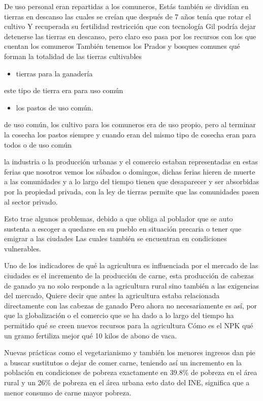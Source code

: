 \documentclass[
  letterpaper,
  DIV=11,
  numbers=noendperiod]{scrartcl}
\providecommand{\tightlist}{%
  \setlength{\itemsep}{0pt}\setlength{\parskip}{0pt}}\usepackage{longtable,booktabs,array}
\begin{document}
De uso personal eran repartidas a los comuneros, Estás también se
dividían en tierras en descanso las cuales se creían que después de 7
años tenía que rotar el cultivo Y recuperada su fertilidad restricción
que con tecnología Gil podría dejar detenerse las tierras en descanso,
pero claro eso pasa por los recursos con los que cuentan los comuneros
También tenemos los Prados y bosques comunes qué forman la totalidad de
las tierras cultivables

\begin{itemize}
\tightlist
\item
  tierras para la ganadería
\end{itemize}

este tipo de tierra era para uso común

\begin{itemize}
\tightlist
\item
  los pastos de uso común.
\end{itemize}

de uso común, los cultivo para los comuneros era de uso propio, pero al
terminar la cosecha los pastos siempre y cuando eran del mismo tipo de
cosecha eran para todos o de uso común

la industria o la producción urbanas y el comercio estaban representadas
en estas ferias que nosotros vemos los sábados o domingos, dichas ferias
hieren de muerte a las comunidades y a lo largo del tiempo tienen que
desaparecer y ser absorbidas por la propiedad privada, con la ley de
tierras permite que las comunidades pasen al sector privado.

Esto trae algunos problemas, debido a que obliga al poblador que se auto
sustenta a escoger a quedarse en su pueblo en situación precaria o tener
que emigrar a las ciudades Las cuales también se encuentran en
condiciones vulnerables.

Uno de los indicadores de qué la agricultura es influenciada por el
mercado de las ciudades es el incremento de la producción de carne, esta
producción de cabezas de ganado ya no solo responde a la agricultura
rural sino también a las exigencias del mercado, Quiere decir que antes
la agricultura estaba relacionada directamente con las cabezas de ganado
Pero ahora no necesariamente es así, por que la globalización o el
comercio que se ha dado a lo largo del tiempo ha permitido qué se creen
nuevos recursos para la agricultura Cómo es el NPK qué un gramo
fertiliza mejor qué 10 kilos de abono de vaca.

Nuevas prácticas como el vegetarianismo y también los menores ingresos
dan pie a buscar sustitutos o dejar de comer carne, teniendo así un
incremento en la población en condiciones de pobreza exactamente en
39.8\% de pobreza en el área rural y un 26\% de pobreza en el área
urbana esto dato del INE, significa que a menor consumo de carne mayor
pobreza.
\end{document}
